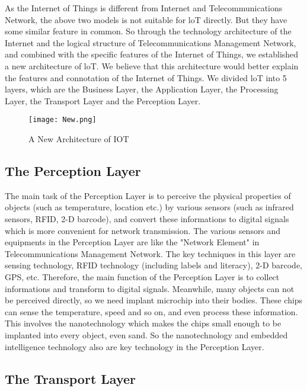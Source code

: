 \documentclass{article}
\begin{document}
As the Internet of Things is different from Internet and Telecommunications Network, the above two models is not suitable for loT directly. But they have some similar feature in common. So through the technology architecture of the Internet and the logical structure of Telecommunications Management Network, and combined with the specific features of the Internet of Things, we established a new architecture of loT. We believe that this architecture would better explain the features and connotation of the Internet of Things. We divided loT into 5 layers, which are the Business Layer, the Application Layer, the Processing Layer, the Transport Layer and the Perception Layer.

\begin{figure}[h]
\centering
\texttt{[image: New.png]}
\caption{\label{fig:frog}A New Architecture of IOT}
\end{figure}

\subsection{The Perception Layer}

The main task of the Perception Layer is to perceive the physical properties of objects (such as temperature, location etc.) by various sensors (such as infrared sensors, RFID, 2-D barcode), and convert these informations to digital signals which is more convenient for network transmission. The various sensors and equipments in the Perception Layer are like the "Network Element" in Telecommunications Management Network. The key techniques in this layer are sensing technology, RFID technology (including labels and literacy), 2-D barcode, GPS, etc. Therefore, the main function of the Perception Layer is to collect informations and transform to digital signals.
Meanwhile, many objects can not be perceived directly, so we need implant microchip into their bodies. These chips can sense the temperature, speed and so on, and even process these information. This involves the nanotechnology which makes the chips small enough to be implanted into every object, even sand. So the nanotechnology and embedded intelligence technology also are key technology in the Perception Layer.

\subsection{The Transport Layer}
\end{document}
